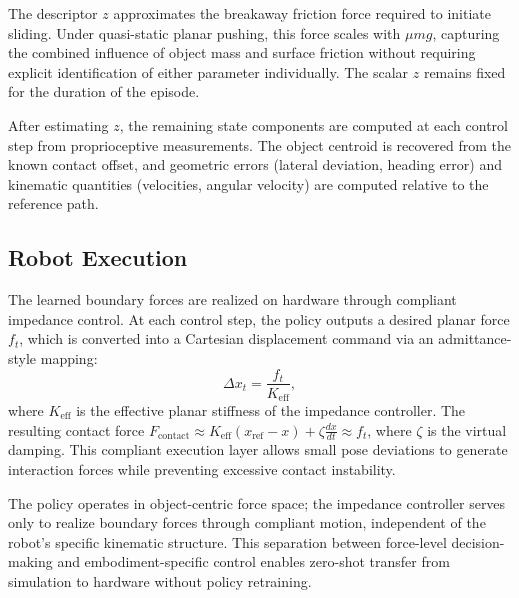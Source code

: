 The descriptor $z$ approximates the breakaway friction force required to initiate sliding. Under quasi-static planar pushing, this force scales with $\mu m g$, capturing the combined influence of object mass and surface friction without requiring explicit identification of either parameter individually. The scalar $z$ remains fixed for the duration of the episode.

After estimating $z$, the remaining state components are computed at each control step from proprioceptive measurements. The object centroid is recovered from the known contact offset, and geometric errors (lateral deviation, heading error) and kinematic quantities (velocities, angular velocity) are computed relative to the reference path.


\subsection{Robot Execution}
\label{sec:pho_execution}

The learned boundary forces are realized on hardware through compliant impedance control. At each control step, the policy outputs a desired planar force $f_t$, which is converted into a Cartesian displacement command via an admittance-style mapping:
\[
\Delta x_t = \frac{f_t}{K_\text{eff}},
\]
where $K_\text{eff}$ is the effective planar stiffness of the impedance controller. The resulting contact force $F_\text{contact} \approx K_\text{eff}(x_\text{ref} - x) + \zeta \frac{dx}{dt} \approx f_t$, where $\zeta$ is the virtual damping. This compliant execution layer allows small pose deviations to generate interaction forces while preventing excessive contact instability.

The policy operates in object-centric force space; the impedance controller serves only to realize boundary forces through compliant motion, independent of the robot's specific kinematic structure. This separation between force-level decision-making and embodiment-specific control enables zero-shot transfer from simulation to hardware without policy retraining.


